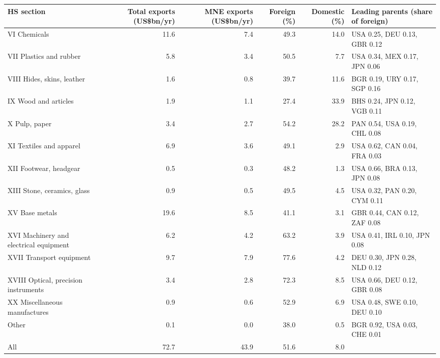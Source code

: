 \begin{tabular}{@{}l r r r r l@{}}
\toprule
HS section & Total exports (US\$bn/yr) & MNE exports (US\$bn/yr) & Foreign (\%) & Domestic (\%) & Leading parents (share of foreign) \\
\midrule
VI Chemicals & 11.6 & 7.4 & 49.3 & 14.0 & USA 0.25, DEU 0.13, GBR 0.12 \\
VII Plastics and rubber & 5.8 & 3.4 & 50.5 & 7.7 & USA 0.34, MEX 0.17, JPN 0.06 \\
VIII Hides, skins, leather & 1.6 & 0.8 & 39.7 & 11.6 & BGR 0.19, URY 0.17, SGP 0.16 \\
IX Wood and articles & 1.9 & 1.1 & 27.4 & 33.9 & BHS 0.24, JPN 0.12, VGB 0.11 \\
X Pulp, paper & 3.4 & 2.7 & 54.2 & 28.2 & PAN 0.54, USA 0.19, CHL 0.08 \\
XI Textiles and apparel & 6.9 & 3.6 & 49.1 & 2.9 & USA 0.62, CAN 0.04, FRA 0.03 \\
XII Footwear, headgear & 0.5 & 0.3 & 48.2 & 1.3 & USA 0.66, BRA 0.13, JPN 0.08 \\
XIII Stone, ceramics, glass & 0.9 & 0.5 & 49.5 & 4.5 & USA 0.32, PAN 0.20, CYM 0.11 \\
XV Base metals & 19.6 & 8.5 & 41.1 & 3.1 & GBR 0.44, CAN 0.12, ZAF 0.08 \\
XVI Machinery and electrical equipment & 6.2 & 4.2 & 63.2 & 3.9 & USA 0.41, IRL 0.10, JPN 0.08 \\
XVII Transport equipment & 9.7 & 7.9 & 77.6 & 4.2 & DEU 0.30, JPN 0.28, NLD 0.12 \\
XVIII Optical, precision instruments & 3.4 & 2.8 & 72.3 & 8.5 & USA 0.66, DEU 0.12, GBR 0.08 \\
XX Miscellaneous manufactures & 0.9 & 0.6 & 52.9 & 6.9 & USA 0.48, SWE 0.10, DEU 0.10 \\
Other & 0.1 & 0.0 & 38.0 & 0.5 & BGR 0.92, USA 0.03, CHE 0.01 \\
\midrule
All & 72.7 & 43.9 & 51.6 & 8.0 & \\
\bottomrule
\end{tabular}
